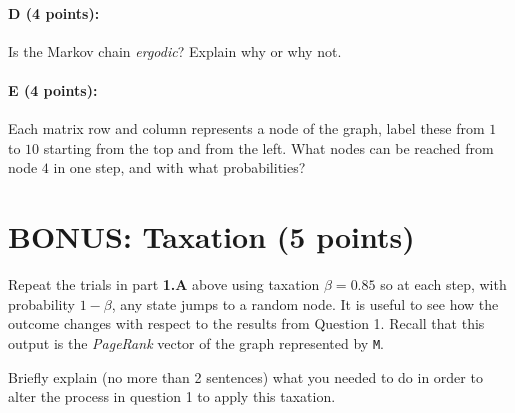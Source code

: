 \documentclass[11pt]{article}
\begin{document}
\paragraph{D (4 points):}
Is the Markov chain \emph{ergodic}?  Explain why or why not.  

\paragraph{E (4 points):}
Each matrix row and column represents a node of the graph, label these from $1$ to $10$ starting from the top and from the left.  
What nodes can be reached from node $4$ in one step, and with what probabilities?  

\section{BONUS:  Taxation (5 points)}

Repeat the trials in part \textbf{1.A} above using taxation $\beta = 0.85$ so at each step, with probability $1-\beta$, any state jumps to a random node.  It is useful to see how the outcome changes with respect to the results from Question 1.  Recall that this output is the \emph{PageRank} vector of the graph represented by \texttt{M}.  

Briefly explain (no more than 2 sentences) what you needed to do in order to alter the process  in question 1 to apply this taxation.  




%
%
%
\end{document}
